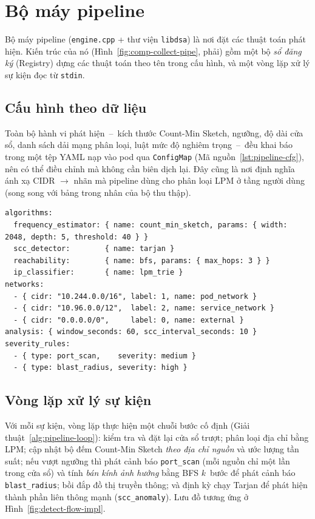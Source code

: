 \section{Bộ máy pipeline}
\label{sec:impl-pipeline}

Bộ máy pipeline (\texttt{engine.cpp} + thư viện \texttt{libdsa}) là nơi đặt các thuật
toán phát hiện. Kiến trúc của nó (Hình~\ref{fig:comp-collect-pipe}, phải) gồm một bộ
\emph{sổ đăng ký} (Registry) dựng các thuật toán theo tên trong cấu hình, và một vòng
lặp xử lý sự kiện đọc từ \texttt{stdin}.

\subsection{Cấu hình theo dữ liệu}
\label{subsec:impl-pipeline-config}

Toàn bộ hành vi phát hiện~--~kích thước Count-Min Sketch, ngưỡng, độ dài cửa sổ, danh
sách dải mạng phân loại, luật mức độ nghiêm trọng~--~đều khai báo trong một tệp YAML
nạp vào pod qua \texttt{ConfigMap} (Mã nguồn~\ref{lst:pipeline-cfg}), nên có thể điều
chỉnh mà không cần biên dịch lại. Đây cũng là nơi định nghĩa ánh xạ CIDR $\rightarrow$
nhãn mà pipeline dùng cho phân loại LPM ở tầng người dùng (song song với bảng trong
nhân của bộ thu thập).

\begin{lstlisting}[language={},caption={Trích cấu hình pipeline: thuật toán, ngưỡng, dải mạng, cửa sổ phân tích (\texttt{pipeline.yaml}).},label={lst:pipeline-cfg}]
algorithms:
  frequency_estimator: { name: count_min_sketch, params: { width: 2048, depth: 5, threshold: 40 } }
  scc_detector:        { name: tarjan }
  reachability:        { name: bfs, params: { max_hops: 3 } }
  ip_classifier:       { name: lpm_trie }
networks:
  - { cidr: "10.244.0.0/16", label: 1, name: pod_network }
  - { cidr: "10.96.0.0/12",  label: 2, name: service_network }
  - { cidr: "0.0.0.0/0",     label: 0, name: external }
analysis: { window_seconds: 60, scc_interval_seconds: 10 }
severity_rules:
  - { type: port_scan,    severity: medium }
  - { type: blast_radius, severity: high }
\end{lstlisting}

\subsection{Vòng lặp xử lý sự kiện}
\label{subsec:impl-pipeline-loop}

Với mỗi sự kiện, vòng lặp thực hiện một chuỗi bước cố định (Giải
thuật~\ref{alg:pipeline-loop}): kiểm tra và đặt lại cửa sổ trượt; phân loại địa chỉ
bằng LPM; cập nhật bộ đếm Count-Min Sketch \emph{theo địa chỉ nguồn} và ước lượng tần
suất; nếu vượt ngưỡng thì phát cảnh báo \texttt{port\_scan} (mỗi nguồn chỉ một lần
trong cửa sổ) và tính \emph{bán kính ảnh hưởng} bằng BFS $k$~bước để phát cảnh báo
\texttt{blast\_radius}; bồi đắp đồ thị truyền thông; và định kỳ chạy Tarjan để phát
hiện thành phần liên thông mạnh (\texttt{scc\_anomaly}). Lưu đồ tương ứng ở
Hình~\ref{fig:detect-flow-impl}.

